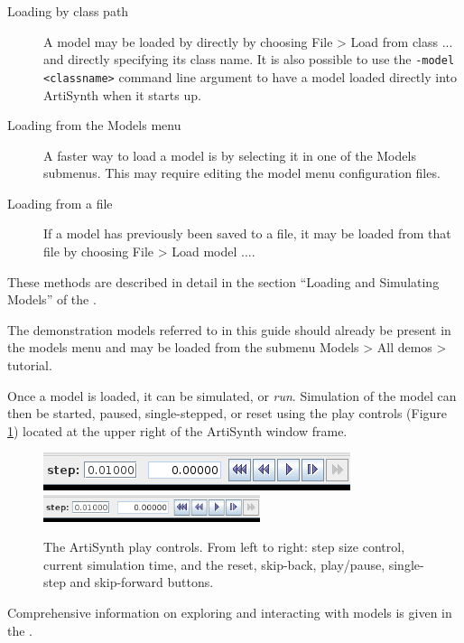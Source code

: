 \begin{description}

\item[Loading by class path]\mbox{}

A model may be loaded by directly by choosing {\sf File > Load from
class ...} and directly specifying its class name. It is also possible
to use the {\tt -model <classname>} command line argument to have a
model loaded directly into ArtiSynth when it starts up.

\item[Loading from the Models menu]\mbox{}

A faster way to load a model is by selecting it in one of the {\sf
Models} submenus. This may require editing the model menu
configuration files.

\item[Loading from a file]\mbox{}

If a model has previously been saved to a file, it may be loaded from
that file by choosing {\sf File > Load model ...}.

\end{description}

These methods are described in detail in the 
section ``Loading and Simulating Models'' of the\pdfbreak
{}.

\begin{sideblock}
The demonstration models referred to in this guide should already
be present in the models menu and may be loaded
from the submenu {\sf Models > All demos > tutorial}.
\end{sideblock}

Once a model is loaded, it can be simulated, or {\it run}.
Simulation
of the model can then be started, paused, single-stepped, or reset
using the play controls (Figure \ref{PlayControlsFig})
located at the upper right of the ArtiSynth window frame.

\begin{figure}[ht]
\begin{center}
\iflatexml
\includegraphics[]{../uiguide/images/playControls}
\else
\includegraphics[width=2.5in]{../uiguide/images/playControls}
\fi
\end{center}
\caption{The ArtiSynth play controls. From left to right: step size
control, current simulation time, and the reset, skip-back,
play/pause, single-step and skip-forward buttons.}%
\label{PlayControlsFig}
\end{figure}

Comprehensive information on exploring and interacting with models is
given in the
.

\ifdefined\maindoc
\else

\fi
